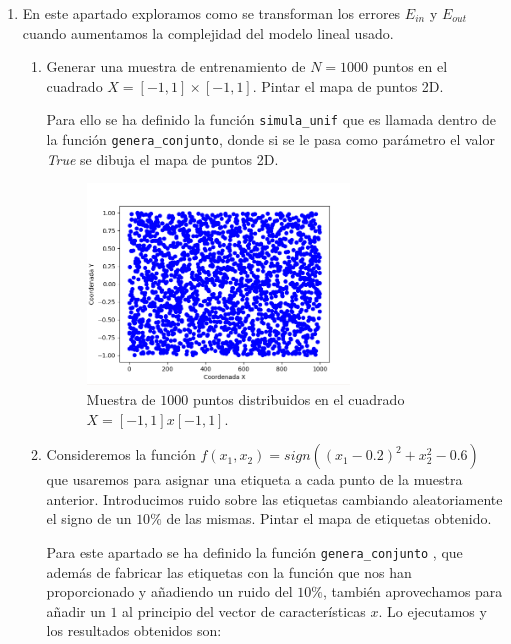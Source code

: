 \documentclass[size=a4, parskip=half, titlepage=false, toc=flat, toc=bib, 12pt]{scrartcl}
\begin{document}
\begin{enumerate}
\item En este apartado exploramos como se transforman los errores $E_{in}$ y $E_{out}$ cuando
aumentamos la complejidad del modelo lineal usado.

\begin{enumerate}

\item Generar una muestra de entrenamiento de $N = 1000$ puntos en el cuadrado
$X = [−1, 1] × [−1, 1]$. Pintar el mapa de puntos 2D.

Para ello se ha definido la función \verb|simula_unif| que es llamada dentro de
la función \verb|genera_conjunto|, donde si se le pasa como parámetro el valor \textit{True}
se dibuja el mapa de puntos 2D.

\begin{figure}[H]
\centering
\includegraphics[width=0.7\textwidth]{./img/ej23}
\caption{Muestra de $1000$ puntos distribuidos en el cuadrado $X = [-1,1]x[-1,1]$.}
\end{figure}

\item Consideremos la función $f (x_1 , x_2 ) = sign((x_1 − 0.2)^2 + x_2^2 − 0.6)$ que usaremos
para asignar una etiqueta a cada punto de la muestra anterior. Introducimos
ruido sobre las etiquetas cambiando aleatoriamente el signo de un $10 \%$ de las
mismas. Pintar el mapa de etiquetas obtenido.

Para este apartado se ha definido la función \verb|genera_conjunto| , que además de fabricar
las etiquetas con la función que nos han proporcionado y añadiendo un ruido del $10 \%$, también
aprovechamos para añadir un $1$ al principio del vector de características $x$. Lo ejecutamos
y los resultados obtenidos son:


\end{enumerate}
\end{enumerate}
\end{document}
